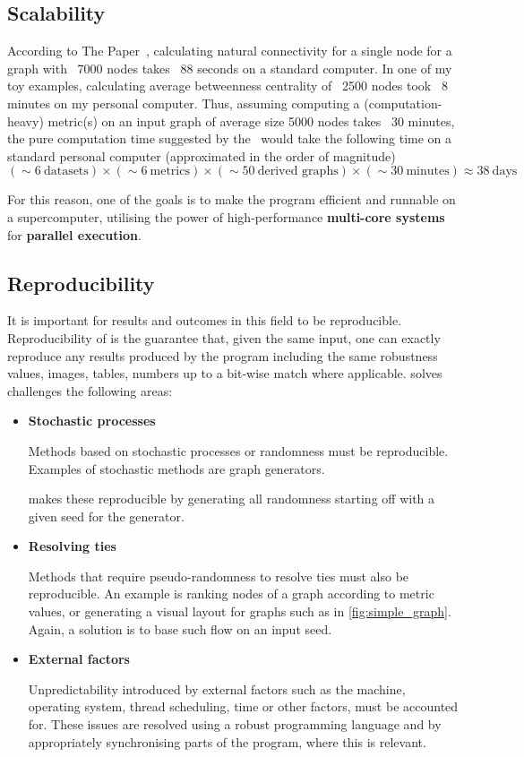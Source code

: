 \subsection{Scalability}

According to The Paper~\cite{Bozhilova2019}, calculating natural connectivity for a single node for a graph with ~7000 nodes takes ~88 seconds on a standard computer.
In one of my toy examples, calculating average betweenness centrality of ~2500 nodes took ~8 minutes on my personal computer.
Thus, assuming computing a (computation-heavy) metric(s) on an input graph of average size 5000 nodes takes ~30 minutes, the pure computation time suggested by the~ would take the following time on a standard personal computer (approximated in the order of magnitude)
\[(\sim 6\ \text{datasets}) \times (\sim 6\ \text{metrics}) \times (\sim 50\ \text{derived graphs}) \times (\sim 30\ \text{minutes}) \approx 38\ \text{days}\]

For this reason, one of the goals is to make the program efficient and runnable on a supercomputer, utilising the power of high-performance \textbf{multi-core systems} for \textbf{parallel execution}.

\subsection{Reproducibility}\label{sec:reproducibility}

It is important for results and outcomes in this field to be reproducible.
Reproducibility of \graffs is the guarantee that, given the same input, one can exactly reproduce any results produced by the program including the same robustness values, images, tables, numbers up to a bit-wise match where applicable.
\graffs solves challenges the following areas:
\begin{itemize}
    \item \textbf{Stochastic processes}

    Methods based on stochastic processes or randomness must be reproducible.
    Examples of stochastic methods are graph generators.

    \graffs makes these reproducible by generating all randomness starting off with a given seed for the generator.

    \item \textbf{Resolving ties}

    Methods that require pseudo-randomness to resolve ties must also be reproducible.
    An example is ranking nodes of a graph according to metric values, or generating a visual layout for graphs such as in \autoref{fig:simple_graph}.
    Again, a solution is to base such flow on an input seed.

    \item \textbf{External factors}

    Unpredictability introduced by external factors such as the machine, operating system, thread scheduling, time or other factors, must be accounted for.
    These issues are resolved using a robust programming language and by appropriately synchronising parts of the program, where this is relevant.
\end{itemize}

